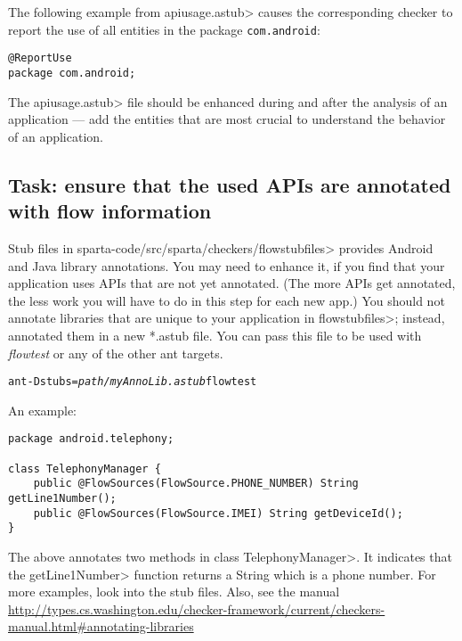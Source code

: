 The following example from \<apiusage.astub> causes the corresponding 
checker to report the use of all entities in the package 
\verb|com.android|:

\begin{Verbatim}
@ReportUse                                                         
package com.android;
\end{Verbatim}

The \<apiusage.astub> file should be enhanced during and after the 
analysis of an application --- add the entities that are most crucial to
understand the behavior of an application.



\subsection{Task: ensure that the used APIs are annotated with flow information\label{flow-task-annotate-apis}}

Stub files in  \<sparta-code/src/sparta/checkers/flowstubfiles> provides Android and Java
library annotations.  You may need to enhance it, if you find that your application
uses APIs that are not yet annotated.
(The  more APIs get annotated, the less work you will have to do in this
step for each new app.) You should not annotate libraries that are unique to your application in \<flowstubfiles>;
instead, annotated them in a new *.astub file. You can pass this file to be used with 
\emph{flowtest} or any of the other ant targets.

\begin{alltt}
ant -Dstubs=\emph{path/myAnnoLib.astub} flowtest
\end{alltt}



An example:

\begin{Verbatim}
package android.telephony;

class TelephonyManager {
    public @FlowSources(FlowSource.PHONE_NUMBER) String getLine1Number();
    public @FlowSources(FlowSource.IMEI) String getDeviceId();
}
\end{Verbatim}

\noindent
The above annotates two methods in class \<TelephonyManager>.
It indicates that the \<getLine1Number> function returns a String which is a
phone number.  For more examples, look into the stub files. Also, see 
the manual \url{http://types.cs.washington.edu/checker-framework/current/checkers-manual.html#annotating-libraries}

